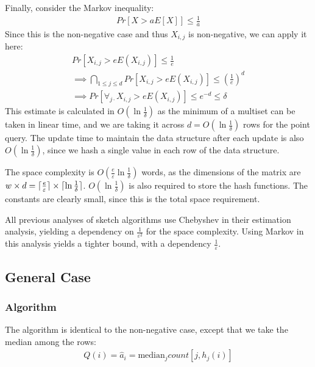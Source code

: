 \documentclass[11pt]{article}
\newcommand{\comment}[1]{}
\newcommand{\sq}{\mathit{Q}}
\DeclarePairedDelimiter\ceil{\lceil}{\rceil}
\begin{document}
Finally, consider the Markov inequality:
\begin{align}
    Pr[X > aE[X]] \leq \frac{1}{a}
\end{align}
Since this is the non-negative case and thus $X_{i, j}$ is non-negative, we can apply it here:
\begin{align}
    Pr[X_{i, j} > e E(X_{i, j})] \leq \frac{1}{e} \\
    \implies \bigcap_{1 \leq j \leq d} Pr[X_{i, j} > e E(X_{i, j})] \leq \left(\frac{1}{e}\right)^d \\
    \implies Pr[\forall_{j \cdot} X_{i, j} > e E(X_{i, j})] \comment{\leq \frac{E(X_{i, j})}{a_i + \varepsilon||a||_1} \leq \frac{\ceil{\frac{\varepsilon}{e}} ||\vec{a}||_1}{a_i + \varepsilon||a||_1}}
      \leq e^{-d} \leq \delta
\end{align}
This estimate is calculated in $O(\ln \frac{1}{\delta})$ as the minimum of a
multiset can be taken in linear time, and we are taking it across $d = O(\ln
\frac{1}{\delta})$ rows for the point query.  The update time to maintain the
data structure after each update is also $O(\ln \frac{1}{\delta})$, since we
hash a single value in each row of the data structure.

The space complexity is $O\left({\frac{e}{\varepsilon}}{\ln
\frac{1}{\delta}}\right)$ words, as the dimensions of the matrix are $w \times d =
\ceil{\frac{e}{\varepsilon}}\times\ceil{\ln \frac{1}{\delta}}$.  $O(\ln
\frac{1}{\delta})$ is also required to store the hash functions.  The constants
are clearly small, since this is the total space requirement.

All previous analyses of sketch algorithms use Chebyshev in their estimation analysis, yielding a dependency on
$\frac{1}{\varepsilon^2}$ for the space complexity.  Using Markov in this analysis yields a tighter bound,
with a dependency $\frac{1}{\varepsilon}$.

\subsection{General Case}
\subsubsection{Algorithm}
The algorithm is identical to the non-negative case, except that we take the median among the rows:
\begin{align}
    \sq(i) = \hat{a}_i = \text{median}_j count[j, h_j(i)]
\end{align}
\end{document}

